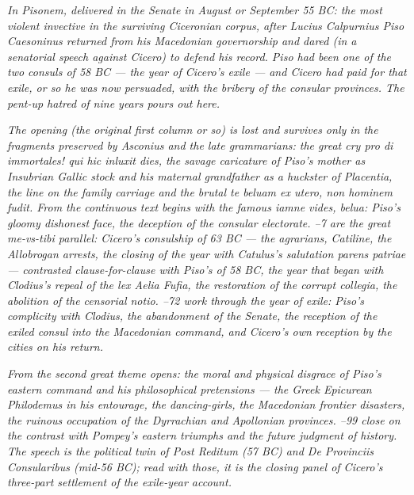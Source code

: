 
\textit{In Pisonem, delivered in the Senate in August or
September 55 BC: the most violent invective in the surviving
Ciceronian corpus, after Lucius Calpurnius Piso Caesoninus
returned from his Macedonian governorship and dared (in a
senatorial speech against Cicero) to defend his record.
Piso had been one of the two consuls of 58 BC --- the year of
Cicero's exile --- and Cicero had paid for that exile, or so
he was now persuaded, with the bribery of the consular
provinces. The pent-up hatred of nine years pours out here.}

\textit{The opening (the original first column or so) is lost
and survives only in the fragments preserved by Asconius and
the late grammarians: the great cry \textit{pro di immortales!
qui hic inluxit dies}, the savage caricature of Piso's mother
as Insubrian Gallic stock and his maternal grandfather as a
huckster of Placentia, the line on the family carriage and the
brutal \textit{te beluam ex utero, non hominem fudit}. From
 the continuous text begins with the famous
\textit{iamne vides, belua}: Piso's gloomy dishonest face, the
deception of the consular electorate. \textsection{}--7 are the great \textit{me-vs-tibi} parallel: Cicero's
consulship of 63 BC --- the agrarians, Catiline, the Allobrogan
arrests, the closing of the year with Catulus's salutation
\textit{parens patriae} --- contrasted clause-for-clause with
Piso's of 58 BC, the year that began with Clodius's repeal of
the lex Aelia Fufia, the restoration of the corrupt collegia,
the abolition of the censorial \textit{notio}. --72 work through the year of exile: Piso's complicity with
Clodius, the abandonment of the Senate, the reception of the
exiled consul into the Macedonian command, and Cicero's own
reception by the cities on his return.}

\textit{From  the second great theme opens: the
moral and physical disgrace of Piso's eastern command and his
philosophical pretensions --- the Greek Epicurean Philodemus
in his entourage, the dancing-girls, the Macedonian frontier
disasters, the ruinous occupation of the Dyrrachian and
Apollonian provinces. \textsection{}--99 close on
the contrast with Pompey's eastern triumphs and the future
judgment of history. The speech is the political twin of
\textit{Post Reditum} (57 BC) and \textit{De Provinciis
Consularibus} (mid-56 BC); read with those, it is the closing
panel of Cicero's three-part settlement of the exile-year
account.}
